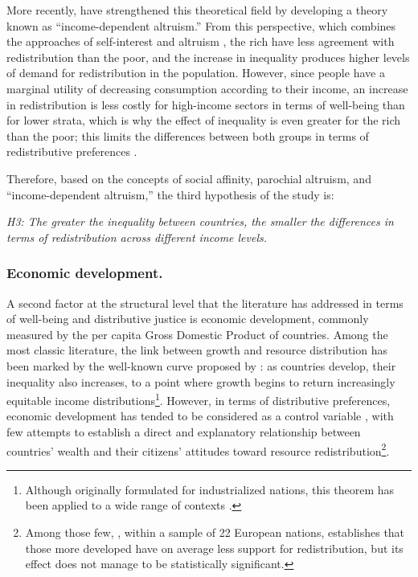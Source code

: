 \documentclass[utf8]{frontiersSCNS} %
\begin{document}
More recently, \textcite{Dimick2016, Dimick2018} have strengthened this theoretical field by developing a theory known as “income-dependent altruism.” From this perspective, which combines the approaches of self-interest and altruism \parencite{Dimick2018}, the rich have less agreement with redistribution than the poor, and the increase in inequality produces higher levels of demand for redistribution in the population. However, since people have a marginal utility of decreasing consumption according to their income, an increase in redistribution is less costly for high-income sectors in terms of well-being than for lower strata, which is why the effect of inequality is even greater for the rich than the poor; this limits the differences between both groups in terms of redistributive preferences \parencite{Dimick2016}.

Therefore, based on the concepts of social affinity, parochial altruism, and “income-dependent altruism,” the third hypothesis of the study is:

\textit{H3: The greater the inequality between countries, the smaller the differences in terms of redistribution across different income levels.}

\subsubsection{Economic development.}

A second factor at the structural level that the literature has addressed in terms of well-being and distributive justice is economic development, commonly measured by the per capita Gross Domestic Product of countries. Among the most classic literature, the link between growth and resource distribution has been marked by the well-known curve proposed by \textcite{KuznetsEconomicGrowthIncome1955}: as countries develop, their inequality also increases, to a point where growth begins to return increasingly equitable income distributions\footnote{Although originally formulated for industrialized nations, this theorem has been applied to a wide range of contexts \parencite{alvaredo2010rich, AtkinsonTopIncomesLong2011, WilliamsonLatinAmericanInequality2015}.}.  However, in terms of distributive preferences, economic development has tended to be considered as a control variable \parencite{RudraGlobalizationDeclineWelfare2002, Schmidt-CatranEconomicinequalitypublic2016, SchroderIncomeInequalityRelated2017}, with few attempts to establish a direct and explanatory relationship between countries’ wealth and their citizens’ attitudes toward resource redistribution\footnote{Among those few, \textcite{FinseraasIncomeInequalityDemand2009}, within a sample of 22 European nations, establishes that those more developed have on average less support for redistribution, but its effect does not manage to be statistically significant.}.
\end{document}
